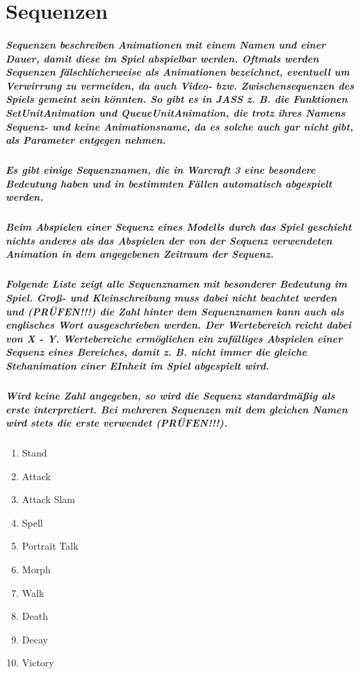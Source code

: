 \chapter{Sequenzen}
\paragraph { Sequenzen beschreiben Animationen mit einem Namen und einer Dauer, damit diese im Spiel abspielbar werden. Oftmals werden Sequenzen fälschlicherweise als Animationen bezeichnet, eventuell um Verwirrung zu vermeiden, da auch Video- bzw. Zwischensequenzen des Spiels gemeint sein könnten. So gibt es in JASS z. B. die Funktionen SetUnitAnimation und QueueUnitAnimation, die trotz ihres Namens Sequenz- und keine Animationsname, da es solche auch gar nicht gibt, als Parameter entgegen nehmen. }
\paragraph { Es gibt einige Sequenznamen, die in Warcraft 3 eine besondere Bedeutung haben und in bestimmten Fällen automatisch abgespielt werden. }
\paragraph { Beim Abspielen einer Sequenz eines Modells durch das Spiel geschieht nichts anderes als das Abspielen der von der Sequenz verwendeten Animation in dem angegebenen Zeitraum der Sequenz. }
\paragraph { Folgende Liste zeigt alle Sequenznamen mit besonderer Bedeutung im Spiel. Groß- und Kleinschreibung muss dabei nicht beachtet werden und (PRÜFEN!!!) die Zahl hinter dem Sequenznamen kann auch als englisches Wort ausgeschrieben werden. Der Wertebereich reicht dabei von X - Y. Wertebereiche ermöglichen ein zufälliges Abspielen einer Sequenz eines Bereiches, damit z. B. nicht immer die gleiche Stehanimation einer EInheit im Spiel abgespielt wird. }
\paragraph { Wird keine Zahl angegeben, so wird die Sequenz standardmäßig als erste interpretiert. Bei mehreren Sequenzen mit dem gleichen Namen wird stets die erste verwendet (PRÜFEN!!!). }
\begin{enumerate}
\item Stand
\item Attack
\item Attack Slam
\item Spell
\item Portrait Talk
\item Morph
\item Walk
\item Death
\item Decay
\item Victory
\end{enumerate}

